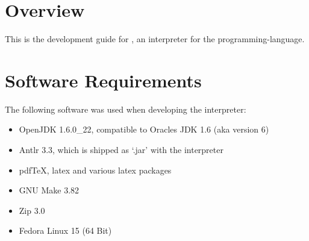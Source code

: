 \def\myDocumentTypeArticle{-}


\globalDate{\today}






\begin{titlepage}
\maketitle
\vfill
\tableofcontents
\end{titlepage}

\section{Overview}

This is the development guide for \setlX, an interpreter for the \SetlX{} programming-language.

\section{Software Requirements}

The following software was used when developing the \setlX{} interpreter:

\begin{itemize}
	\item OpenJDK 1.6.0\_22, compatible to Oracles JDK 1.6 (aka version 6)
	\item Antlr 3.3, which is shipped as `.jar' with the interpreter
	\item pdfTeX, latex and various latex packages
	\item GNU Make 3.82
	\item Zip 3.0
	\item Fedora Linux 15 (64 Bit)
\end{itemize}

